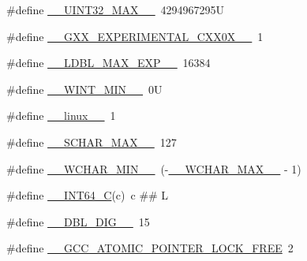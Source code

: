\begin{DoxyCompactItemize}
\item 
\#define \hyperlink{build-analizer__host-_desktop___qt__5__9__0___g_c_c__64bit-debug_2moc__predefs_8h_ab4425dccbcddb2363a2a8a67367a5b42}{\+\_\+\+\_\+\+U\+I\+N\+T32\+\_\+\+M\+A\+X\+\_\+\+\_\+}~4294967295\+U
\item 
\#define \hyperlink{build-analizer__host-_desktop___qt__5__9__0___g_c_c__64bit-debug_2moc__predefs_8h_a213133a8dca206becf88c2e3523b124a}{\+\_\+\+\_\+\+G\+X\+X\+\_\+\+E\+X\+P\+E\+R\+I\+M\+E\+N\+T\+A\+L\+\_\+\+C\+X\+X0\+X\+\_\+\+\_\+}~1
\item 
\#define \hyperlink{build-analizer__host-_desktop___qt__5__9__0___g_c_c__64bit-debug_2moc__predefs_8h_ae221a8e373285cf10c22926762f477f5}{\+\_\+\+\_\+\+L\+D\+B\+L\+\_\+\+M\+A\+X\+\_\+\+E\+X\+P\+\_\+\+\_\+}~16384
\item 
\#define \hyperlink{build-analizer__host-_desktop___qt__5__9__0___g_c_c__64bit-debug_2moc__predefs_8h_a135696718aa5b38e58be73aaece6654f}{\+\_\+\+\_\+\+W\+I\+N\+T\+\_\+\+M\+I\+N\+\_\+\+\_\+}~0\+U
\item 
\#define \hyperlink{build-analizer__host-_desktop___qt__5__9__0___g_c_c__64bit-debug_2moc__predefs_8h_a1b27e3508a4c1e97875297882a95f503}{\+\_\+\+\_\+linux\+\_\+\+\_\+}~1
\item 
\#define \hyperlink{build-analizer__host-_desktop___qt__5__9__0___g_c_c__64bit-debug_2moc__predefs_8h_a87b7ceac2198cab045e40c9a64b11679}{\+\_\+\+\_\+\+S\+C\+H\+A\+R\+\_\+\+M\+A\+X\+\_\+\+\_\+}~127
\item 
\#define \hyperlink{build-analizer__host-_desktop___qt__5__9__0___g_c_c__64bit-debug_2moc__predefs_8h_a01b915d3ec5439de746f1d5e9f76dc3d}{\+\_\+\+\_\+\+W\+C\+H\+A\+R\+\_\+\+M\+I\+N\+\_\+\+\_\+}~(-\/\hyperlink{build-analizer__host-_desktop___qt__5__9__0___g_c_c__64bit-_release_2moc__predefs_8h_a65ac8cd0434319a3a31dc031409c218a}{\+\_\+\+\_\+\+W\+C\+H\+A\+R\+\_\+\+M\+A\+X\+\_\+\+\_\+} -\/ 1)
\item 
\#define \hyperlink{build-analizer__host-_desktop___qt__5__9__0___g_c_c__64bit-debug_2moc__predefs_8h_a4b8971e411b88166747d2a3c2425eaee}{\+\_\+\+\_\+\+I\+N\+T64\+\_\+\+C}(c)~c \#\# L
\item 
\#define \hyperlink{build-analizer__host-_desktop___qt__5__9__0___g_c_c__64bit-debug_2moc__predefs_8h_a61969667ef3b668024a20df9bc34c991}{\+\_\+\+\_\+\+D\+B\+L\+\_\+\+D\+I\+G\+\_\+\+\_\+}~15
\item 
\#define \hyperlink{build-analizer__host-_desktop___qt__5__9__0___g_c_c__64bit-debug_2moc__predefs_8h_aa808bc3159395526ac0c07d36b87dec1}{\+\_\+\+\_\+\+G\+C\+C\+\_\+\+A\+T\+O\+M\+I\+C\+\_\+\+P\+O\+I\+N\+T\+E\+R\+\_\+\+L\+O\+C\+K\+\_\+\+F\+R\+E\+E}~2

\end{DoxyCompactItemize}
